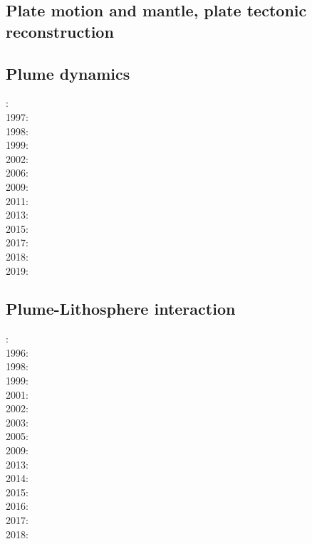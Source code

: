 \subsection*{Plate motion and mantle, plate tectonic reconstruction}

\noindent
\cite{mcse73}
\cite{zieg92a}
\cite{zhgm98}
\cite{evan03}\cite{reta03}
\cite{lizh09}\cite{vasv09}
\cite{huss12}\cite{gutz12}
\cite{mosq13}
\cite{yoha15}
\cite{tewg19}

\subsection*{Plume dynamics}

: \cite{nasf94}\cite{hayu94}\\
1997: \cite{vank97}\\
1998: \cite{thta98}\\
1999: \cite{lays99}\\
2002: \cite{falt02}\\
2006: \cite{isst06}\cite{liva06a}\cite{liva06b}\cite{zhon06}\cite{mita06}\\
2009: \cite{vavl09}\\
2011: \cite{toyu11}\cite{talz11}\cite{burk11}\cite{memm11}\cite{dalt11}\\
2013: \cite{dagm13}\cite{madd13}\cite{ande13}\\
2015: \cite{daso15}\cite{hafg15}\\
2017: \cite{zhli17}\\
2018: \cite{dacc18}\\
2019: \cite{argc19}

\subsection*{Plume-Lithosphere interaction}

: \cite{rich94}\\
1996: \cite{zhgm96}\\
1998: \cite{bisp98}\cite{most98}\\
1999: \cite{most99}\\
2001: \cite{vapy01}\\
2002: \cite{foul02}\\
2003: \cite{vazh03}\\
2005: \cite{bugu05}\\
2009: \cite{bucl09}\cite{zhgy09}\cite{baiv10}\\
2013: \cite{bemm12}\cite{brps13}\\
2014: \cite{buge14}\cite{gery14b}\cite{buto14}\\
2015: \cite{bemm15}\cite{gesb15}\cite{kocb15}\cite{meds15}\\
2016: \cite{fige16}\cite{gadb16}\\
2017: \cite{bahf17}\cite{brsg17}\cite{bahf17}\cite{bekb17}\\
2018: \cite{daga18}

